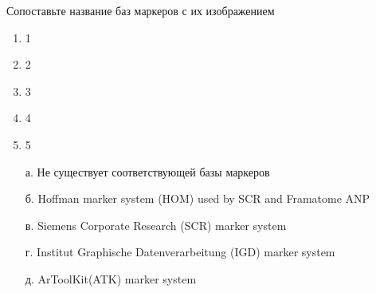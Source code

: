 
Сопоставьте название баз маркеров с их изображением


        \begin{enumerate}
            \item 1
            \item 2
            \item 3
            \item 4
            \item 5
        \end{enumerate}

        \begin{enumerate}
            \item[а.] Не существует соответствующей базы маркеров
            \item[б.] Hoffman marker system (HOM) used by SCR and Framatome ANP
            \item[в.] Siemens Corporate Research (SCR) marker system
            \item[г.] Institut Graphische Datenverarbeitung (IGD) marker system
            \item[д.] ArToolKit(ATK) marker system 
        \end{enumerate}